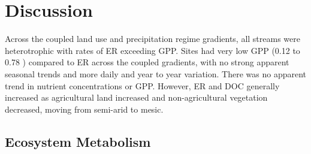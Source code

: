 %

\chapter[DISCUSSION]{Discussion}
\vspace{-12pt}

 Across the coupled land use and precipitation regime gradients, all streams were heterotrophic with rates of ER exceeding GPP. Sites had very low GPP (0.12 to 0.78 \unit{\goxy}) compared to ER across the coupled gradients, with no strong apparent seasonal trends and more daily and year to year variation. There was no apparent trend in nutrient concentrations or GPP. However, ER and DOC generally increased as agricultural land increased and non-agricultural vegetation decreased, moving from semi-arid to mesic.
 
\section{Ecosystem Metabolism}






